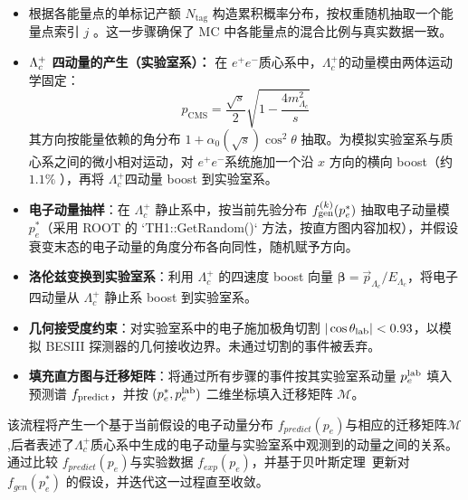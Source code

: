 \begin{itemize}
    \item {} 根据各能量点的单标记产额 $N_{\mathrm{tag}}$ 构造累积概率分布，按权重随机抽取一个能量点索引 $j$ 。这一步骤确保了 MC 中各能量点的混合比例与真实数据一致。
    \item \textbf{$\Lambda_c^+$ 四动量的产生（实验室系）：} 在 $e^{+} e^{-}$质心系中，$\Lambda_c^{+}$的动量模由两体运动学固定：
\begin{equation}
    p_{\mathrm{CMS}}=\frac{\sqrt{s}}{2} \sqrt{1-\frac{4 m_{\Lambda_c}^2}{s}}
\end{equation}
其方向按能量依赖的角分布 $1+\alpha_0(\sqrt{s}) \cos ^2 \theta$ 抽取。为模拟实验室系与质心系之间的微小相对运动，对 $e^{+} e^{-}$系统施加一个沿 $x$ 方向的横向 boost（约 $1.1 \%$ ），再将 $\Lambda_c^{+}$四动量 boost 到实验室系。
    \item \textbf{电子动量抽样}：在 $\Lambda_c^+$ 静止系中，按当前先验分布 $f_{\rm gen}^{(k)}(p_e^*)$ 抽取电子动量模 $p_e^*$（采用 ROOT 的 `TH1::GetRandom()` 方法，按直方图内容加权），并假设衰变末态的电子动量的角度分布各向同性，随机赋予方向。

    \item \textbf{洛伦兹变换到实验室系}：利用 $\Lambda_c^+$ 的四速度 boost 向量 $\boldsymbol{\beta} = \vec{p}_{\Lambda_c}/E_{\Lambda_c}$，将电子四动量从 $\Lambda_c^+$ 静止系 boost 到实验室系。

    \item \textbf{几何接受度约束}：对实验室系中的电子施加极角切割 $|\cos\theta_{\rm lab}| < 0.93$，以模拟 BESIII 探测器的几何接收边界。未通过切割的事件被丢弃。

    \item \textbf{填充直方图与迁移矩阵}：将通过所有步骤的事件按其实验室系动量 $p_e^{\rm lab}$ 填入预测谱 $f_{\rm predict}$，并按 $(p_e^*, p_e^{\rm lab})$ 二维坐标填入迁移矩阵 $\mathcal{M}$。
\end{itemize}
该流程将产生一个基于当前假设的电子动量分布 $f_{predict}(p_e)$与相应的迁移矩阵$\mathcal{M}$,后者表述了$\Lambda_c^+$质心系中生成的电子动量与实验室系中观测到的动量之间的关系。通过比较 $f_{predict}(p_e)$与实验数据 $f_{exp}(p_e)$，并基于贝叶斯定理~\cite{DAgostini:2010hil}更新对 $f_{gen}(p^*_e)$ 的假设，并迭代这一过程直至收敛。

